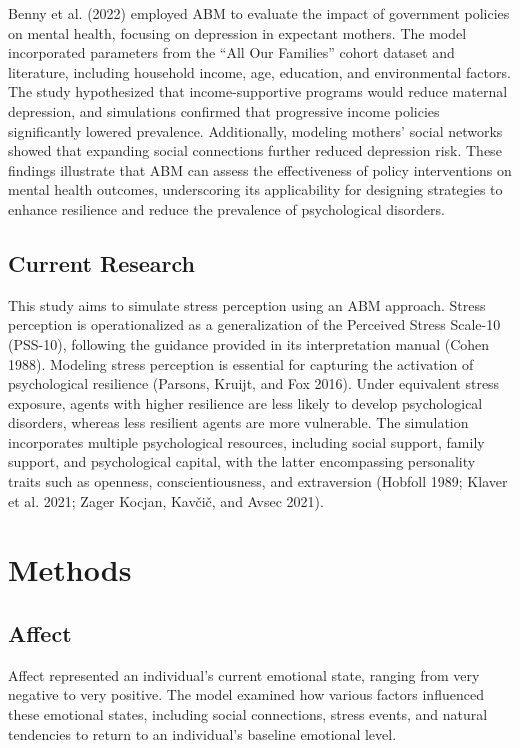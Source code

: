 \documentclass[
  letterpaper,
  DIV=11,
  numbers=noendperiod]{scrartcl}
\begin{document}
Benny et al. (2022) employed ABM to evaluate the impact of government
policies on mental health, focusing on depression in expectant mothers.
The model incorporated parameters from the ``All Our Families'' cohort
dataset and literature, including household income, age, education, and
environmental factors. The study hypothesized that income-supportive
programs would reduce maternal depression, and simulations confirmed
that progressive income policies significantly lowered prevalence.
Additionally, modeling mothers' social networks showed that expanding
social connections further reduced depression risk. These findings
illustrate that ABM can assess the effectiveness of policy interventions
on mental health outcomes, underscoring its applicability for designing
strategies to enhance resilience and reduce the prevalence of
psychological disorders.

\subsection{Current Research}\label{current-research}

This study aims to simulate stress perception using an ABM approach.
Stress perception is operationalized as a generalization of the
Perceived Stress Scale-10 (PSS-10), following the guidance provided in
its interpretation manual (Cohen 1988). Modeling stress perception is
essential for capturing the activation of psychological resilience
(Parsons, Kruijt, and Fox 2016). Under equivalent stress exposure,
agents with higher resilience are less likely to develop psychological
disorders, whereas less resilient agents are more vulnerable. The
simulation incorporates multiple psychological resources, including
social support, family support, and psychological capital, with the
latter encompassing personality traits such as openness,
conscientiousness, and extraversion (Hobfoll 1989; Klaver et al. 2021;
Zager Kocjan, Kavčič, and Avsec 2021).

\section{Methods}\label{methods}

\subsection{Affect}\label{affect}

Affect represented an individual's current emotional state, ranging from
very negative to very positive. The model examined how various factors
influenced these emotional states, including social connections, stress
events, and natural tendencies to return to an individual's baseline
emotional level.
\end{document}
